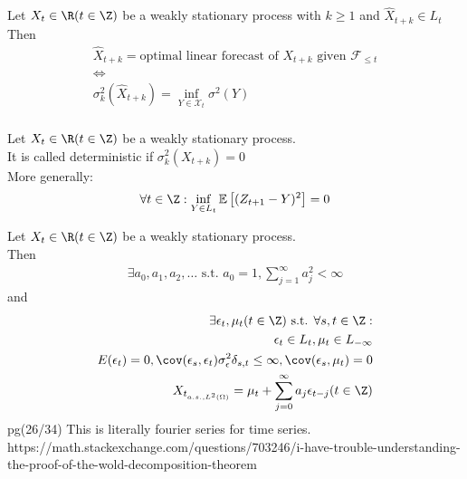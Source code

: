 \documentclass[answers,12pt,addpoints]{exam}
\begin{document}
\begin{definition}
    Let $X_t \in \R (t \in \Z)$ be a weakly stationary process with $k \geq 1$ and $\hat{X}_{t+k} \in L_t$\\
    Then
    \begin{align*}
        \hat{X}_{t+k} = \text{optimal linear forecast of $X_{t+k}$ given $\mathscr{F}_{\leq t}$} \\
        \iff \\
        \sigma_k^2(\hat{X}_{t+k}) = \inf_{Y \in \mathscr{X}_t} \sigma^2(Y)\\
    \end{align*}
\end{definition}
\begin{definition}
    Let $X_t \in \R (t \in \Z)$ be a weakly stationary process.\\
    It is called deterministic if $\sigma_k^2(X_{t+k}) = 0$ \\
    More generally:
    \begin{align*}
        \forall t \in \Z: \inf_{Y \in L_t} \mathbb{E}\left[(Z_{t+1} - Y)^2\right] =0
    \end{align*}
\end{definition}
\begin{theorem}
    Let $X_t \in \R (t \in \Z)$ be a weakly stationary process.\\
    Then 
    \begin{align*}
        \exists a_0, a_1, a_2, \ldots \text{ s.t. } a_0 = 1, \sum_{j=1}^{\infty} a_j^2 < \infty
    \end{align*}
    and 
    \begin{align*}
        \exists \epsilon_t, \mu_t (t \in \Z) \text{ s.t. } \forall s,t \in \Z:\\
        \epsilon_t \in L_t, \mu_t \in L_{-\infty}\\
        E(\epsilon_t) = 0, \cov(\epsilon_s, \epsilon_t) \sigma_{\epsilon}^2 \delta_{s,t} \leq \infty, \cov(\epsilon_s, \mu_t) = 0\\
        X_{t_{a.s., L^2(\Omega)}} = \mu_t + \sum_{j=0}^{\infty} a_j \epsilon_{t-j} (t \in \Z)
    \end{align*}
    pg(26/34)
    This is literally fourier series for time series.\\
    https://math.stackexchange.com/questions/703246/i-have-trouble-understanding-the-proof-of-the-wold-decomposition-theorem
\end{theorem}
\end{document}
